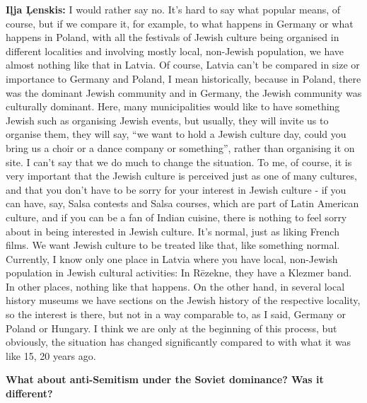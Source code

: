 \textbf{Iļja Ļenskis:} I would rather say no. It’s hard to say what popular means, of course, but if we compare it, for example, to what happens in Germany or what happens in Poland, with all the festivals of Jewish culture being organised in different localities and involving mostly local, non-Jewish population, we have almost nothing like that in Latvia. Of course, Latvia can’t be compared in size or importance to Germany and Poland, I mean historically, because in Poland, there was the dominant Jewish community and in Germany, the Jewish community was culturally dominant. Here, many municipalities would like to have something Jewish such as organising Jewish events, but usually, they will invite us to organise them, they will say, ``we want to hold a Jewish culture day, could you bring us a choir or a dance company or something'', rather than organising it on site. I can’t say that we do much to change the situation. To me, of course, it is very important that the Jewish culture is perceived just as one of many cultures, and that you don’t have to be sorry for your interest in Jewish culture - if you can have, say, Salsa contests and Salsa courses, which are part of Latin American culture, and if you can be a fan of Indian cuisine, there is nothing to feel sorry about in being interested in Jewish culture. It's normal, just as liking French films. We want Jewish culture to be treated like that, like something normal. Currently, I know only one place in Latvia where you have local, non-Jewish population in Jewish cultural activities: In Rēzekne, they have a Klezmer band. In other places, nothing like that happens. On the other hand, in several local history museums we have sections on the Jewish history of the respective locality, so the interest is there, but not in a way comparable to, as I said, Germany or Poland or Hungary. I think we are only at the beginning of this process, but obviously, the situation has changed significantly compared to with what it was like 15, 20 years ago. 

\textbf{What about anti-Semitism under the Soviet dominance? Was it different?}

